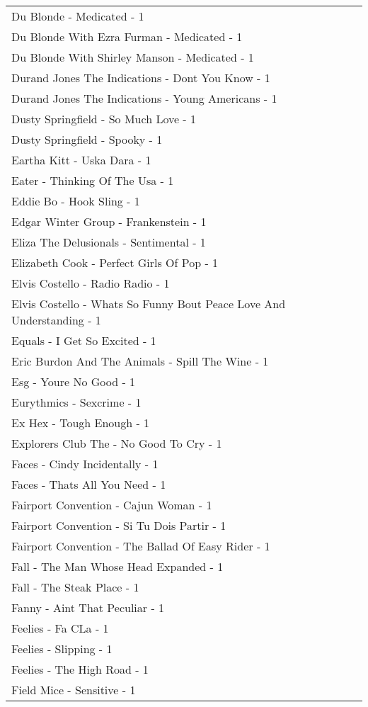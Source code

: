 \documentclass[
]{article}
\begin{document}
\begin{longtable}{l}
Du Blonde - Medicated - 1 \\ 
Du Blonde With Ezra Furman - Medicated - 1 \\ 
Du Blonde With Shirley Manson - Medicated - 1 \\ 
Durand Jones The Indications - Dont You Know - 1 \\ 
Durand Jones The Indications - Young Americans - 1 \\ 
Dusty Springfield - So Much Love - 1 \\ 
Dusty Springfield - Spooky - 1 \\ 
Eartha Kitt - Uska Dara - 1 \\ 
Eater - Thinking Of The Usa - 1 \\ 
Eddie Bo - Hook Sling - 1 \\ 
Edgar Winter Group - Frankenstein - 1 \\ 
Eliza The Delusionals - Sentimental - 1 \\ 
Elizabeth Cook - Perfect Girls Of Pop - 1 \\ 
Elvis Costello - Radio Radio - 1 \\ 
Elvis Costello - Whats So Funny Bout Peace Love And Understanding - 1 \\ 
Equals - I Get So Excited - 1 \\ 
Eric Burdon And The Animals - Spill The Wine - 1 \\ 
Esg - Youre No Good - 1 \\ 
Eurythmics - Sexcrime - 1 \\ 
Ex Hex - Tough Enough - 1 \\ 
Explorers Club The - No Good To Cry - 1 \\ 
Faces - Cindy Incidentally - 1 \\ 
Faces - Thats All You Need - 1 \\ 
Fairport Convention - Cajun Woman - 1 \\ 
Fairport Convention - Si Tu Dois Partir - 1 \\ 
Fairport Convention - The Ballad Of Easy Rider - 1 \\ 
Fall - The Man Whose Head Expanded - 1 \\ 
Fall - The Steak Place - 1 \\ 
Fanny - Aint That Peculiar - 1 \\ 
Feelies - Fa CLa - 1 \\ 
Feelies - Slipping - 1 \\ 
Feelies - The High Road - 1 \\ 
Field Mice - Sensitive - 1 \\ 

\end{longtable}
\end{document}
